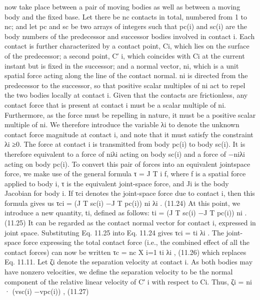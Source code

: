 now take place between a pair of moving bodies as well as between a moving body and the fixed base. Let there be nc contacts in total, numbered from 1 to nc; and let pc and sc be two arrays of integers such that pc(i) and sc(i) are the body numbers of the predecessor and successor bodies involved in contact i. Each contact is further characterized by a contact point, Ci, which lies on the surface of the predecessor; a second point, C′ i, which coincides with Ci at the current instant but is fixed in the successor; and a normal vector, ni, which is a unit spatial force acting along the line of the contact normal. ni is directed from the predecessor to the successor, so that positive scalar multiples of ni act to repel the two bodies locally at contact i. Given that the contacts are frictionless, any contact force that is present at contact i must be a scalar multiple of ni. Furthermore, as the force must be repelling in nature, it must be a positive scalar multiple of ni. We therefore introduce the variable λi to denote the unknown contact force magnitude at contact i, and note that it must satisfy the constraint λi ≥0. The force at contact i is transmitted from body pc(i) to body sc(i). It is therefore equivalent to a force of niλi acting on body sc(i) and a force of −niλi acting on body pc(i). To convert this pair of forces into an equivalent jointspace force, we make use of the general formula τ = J T i f, where f is a spatial force applied to body i, τ is the equivalent joint-space force, and Ji is the body Jacobian for body i. If τci denotes the joint-space force due to contact i, then this formula gives us τci = (J T sc(i) −J T pc(i)) ni λi . (11.24) At this point, we introduce a new quantity, ti, defined as follows: ti = (J T sc(i) −J T pc(i)) ni . (11.25) It can be regarded as the contact normal vector for contact i, expressed in joint space. Substituting Eq. 11.25 into Eq. 11.24 gives τci = ti λi . The joint-space force expressing the total contact force (i.e., the combined effect of all the contact forces) can now be written τc = nc X i=1 ti λi , (11.26) which replaces Eq. 11.11. Let ζi denote the separation velocity at contact i. As both bodies may have nonzero velocities, we define the separation velocity to be the normal component of the relative linear velocity of C′ i with respect to Ci. Thus, ζi = ni · (vsc(i) −vpc(i)) , (11.27)

